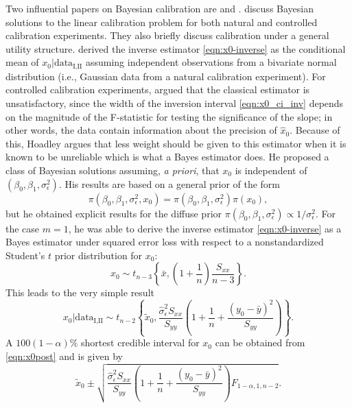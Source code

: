 \documentclass[cmfont,usenames,dvipsnames,leqno]{afit-etd}\usepackage[]{graphicx}\usepackage[]{color}
\newcommand{\wh}[1]{\ensuremath{\widehat{#1}}}
\newcommand{\wt}[1]{\ensuremath{\widetilde{#1}}}
\begin{document}
Two influential papers on Bayesian calibration are \citet{hoadley_bayesian_1970} and \citet{hunter_bayesian_1981}. \citet[chap. 10]{aitchison_statistical_1980} discuss Bayesian solutions to the linear calibration problem for both natural and controlled calibration experiments. They also briefly discuss calibration under a general utility structure. \citet{dunsmore_bayesian_1967} derived the inverse estimator \eqref{eqn:x0-inverse} as the conditional mean of $x_0|\text{data}_{\text{I}, \text{II}}$ assuming independent observations from a bivariate normal distribution (i.e., Gaussian data from a natural calibration experiment). For controlled calibration experiments, \citet{hoadley_bayesian_1970} argued that the classical estimator is unsatisfactory, since the width of the inversion interval \eqref{eqn:x0_ci_inv} depends on the magnitude of the F-statistic for testing the significance of the slope; in other words, the data contain information about the precision of $\wh{x}_0$. Because of this, Hoadley argues that less weight should be given to this estimator when it is known to be unreliable which is what a Bayes estimator does. He proposed a class of Bayesian solutions assuming, \textit{a priori}, that $x_0$ is independent of $(\beta_0, \beta_1, \sigma_\epsilon^2)$. His results are based on a general prior of the form 
\begin{equation*}
  \pi\left(\beta_0, \beta_1, \sigma_\epsilon^2, x_0\right) = \pi\left(\beta_0, \beta_1, \sigma_\epsilon^2\right) \pi\left(x_0\right), 
\end{equation*}
but he obtained explicit results for the diffuse prior $\pi\left(\beta_0, \beta_1, \sigma_\epsilon^2\right) \propto 1/\sigma_\epsilon^2$. For the case $m=1$, he was able to derive the inverse estimator \eqref{eqn:x0-inverse} as a Bayes estimator under squared error loss with respect to a nonstandardized Student's $t$ prior distribution for $x_0$:
\begin{equation}
\label{eqn:x0prior}
  x_0 \sim t_{n-3}\left\{\bar{x}, \left(1+\frac{1}{n}\right)\frac{S_{xx}}{n-3}\right\}. 
\end{equation}
This leads to the very simple result
\begin{equation}
\label{eqn:x0post}
  x_0|\text{data}_{\text{I}, \text{II}} \sim t_{n-2}\left\{\wt{x}_0, \frac{\wh{\sigma}_\epsilon^2 S_{xx}}{S_{yy}}\left( 1+\frac{1}{n}+\frac{(y_0 - \bar{y})^2}{S_{yy}} \right)\right\}. 
\end{equation}
A $100(1-\alpha)\%$ shortest credible interval for $x_0$ can be obtained from \eqref{eqn:x0post} and is given by
\begin{equation}
\label{eqn:sci}
  \wt{x}_0 \pm \sqrt{\frac{\wh{\sigma}_\epsilon^2 S_{xx}}{S_{yy}}\left( 1+\frac{1}{n}+\frac{(y_0 - \bar{y})^2}{S_{yy}} \right)F_{1-\alpha, 1, n-2}}.
\end{equation}
\end{document}
